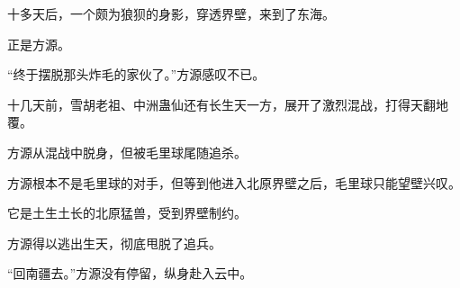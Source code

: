 \begin{this_body}
十多天后，一个颇为狼狈的身影，穿透界壁，来到了东海。

正是方源。

“终于摆脱那头炸毛的家伙了。”方源感叹不已。

十几天前，雪胡老祖、中洲蛊仙还有长生天一方，展开了激烈混战，打得天翻地覆。

方源从混战中脱身，但被毛里球尾随追杀。

方源根本不是毛里球的对手，但等到他进入北原界壁之后，毛里球只能望壁兴叹。

它是土生土长的北原猛兽，受到界壁制约。

方源得以逃出生天，彻底甩脱了追兵。

“回南疆去。”方源没有停留，纵身赴入云中。

\end{this_body}

